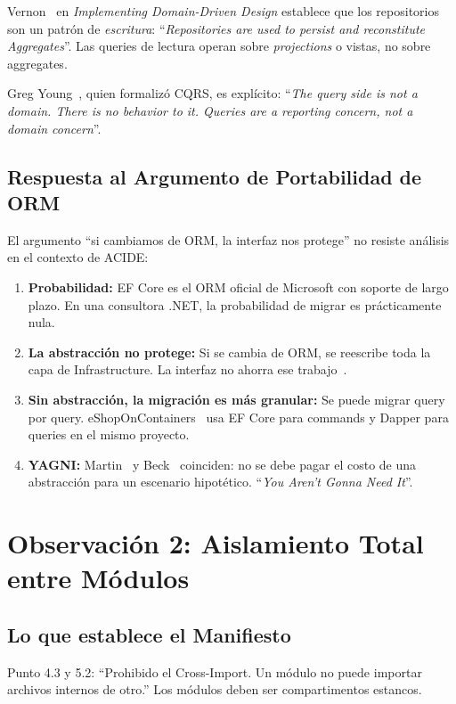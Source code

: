 \documentclass[conference]{IEEEtran}
\begin{document}
Vernon~\cite{vernon2013} en \textit{Implementing Domain-Driven Design} establece que los repositorios son un patr\'on de \textit{escritura}: ``\textit{Repositories are used to persist and reconstitute Aggregates}''. Las queries de lectura operan sobre \textit{projections} o vistas, no sobre aggregates.

Greg Young~\cite{young2010}, quien formaliz\'o CQRS, es expl\'icito: ``\textit{The query side is not a domain. There is no behavior to it. Queries are a reporting concern, not a domain concern}''.

\subsection{Respuesta al Argumento de Portabilidad de ORM}

El argumento ``si cambiamos de ORM, la interfaz nos protege'' no resiste an\'alisis en el contexto de ACIDE:

\begin{enumerate}[leftmargin=1.5em, itemsep=2pt]
    \item \textbf{Probabilidad:} EF Core es el ORM oficial de Microsoft con soporte de largo plazo. En una consultora .NET, la probabilidad de migrar es pr\'acticamente nula.
    \item \textbf{La abstracci\'on no protege:} Si se cambia de ORM, se reescribe toda la capa de Infrastructure. La interfaz no ahorra ese trabajo~\cite{fowler2002}.
    \item \textbf{Sin abstracci\'on, la migraci\'on es m\'as granular:} Se puede migrar query por query. eShopOnContainers~\cite{microsoft2023} usa EF Core para commands y Dapper para queries en el mismo proyecto.
    \item \textbf{YAGNI:} Martin~\cite{martin2003} y Beck~\cite{beck2004} coinciden: no se debe pagar el costo de una abstracci\'on para un escenario hipot\'etico. ``\textit{You Aren't Gonna Need It}''.
\end{enumerate}


\section{Observaci\'on 2: Aislamiento Total entre M\'odulos}
\label{sec:obs2}

\subsection{Lo que establece el Manifiesto}
Punto 4.3 y 5.2: ``Prohibido el Cross-Import. Un m\'odulo no puede importar archivos internos de otro.'' Los m\'odulos deben ser compartimentos estancos.
\end{document}
